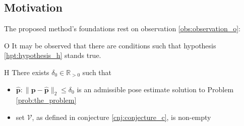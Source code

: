 \subsection{Motivation}

The proposed method's foundations rest on observation \ref{obs:observation_o}:

\begin{customobs}{O}
  \label{obs:observation_o} It may be observed that there are conditions such
  that hypothesis \ref{hpt:hypothesis_h} stands true.
\end{customobs}

\begin{customhpt}{H}
  \label{hpt:hypothesis_h}
  There exists $\delta_0 \in \mathbb{R}_{> 0}$ such that
  \begin{itemize}
    \item $\hat{\bm{p}}: \|\bm{p}-\hat{\bm{p}}\|_2 \leq \delta_0$ is an
          admissible pose estimate solution to Problem \ref{prob:the_problem}
    \item set $\mathcal{V}$, as defined in conjecture \ref{cnj:conjecture_c},
          is non-empty
  \end{itemize}
\end{customhpt}

